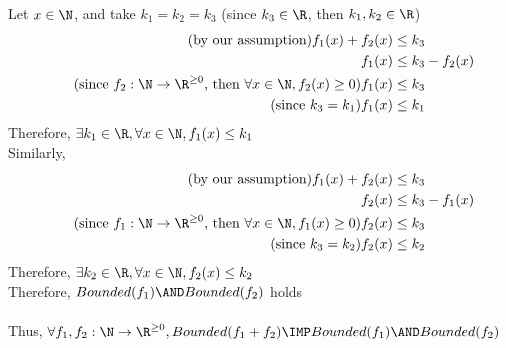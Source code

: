 \documentclass[12pt]{article}
\begin{document}
Let $x\in \N$, and take $k_1 = k_2 = k_3$ (since $k_3 \in \R$, then $k_1,k_2 \in \R$)\\
\begin{align*}
    \tag{by our assumption}
    f_1(x) + f_2(x) &\le k_3\\
    f_1(x) &\le k_3 - f_2(x)\\
    \tag{since $f_2:\N \to \R^{\ge 0}$, then $\forall x \in \N,f_2(x) \ge 0$}
    f_1(x) &\le k_3\\
    \tag{since $k_3 = k_1$}
    f_1(x) &\le k_1
\end{align*}
Therefore, $\exists k_1 \in \R,\forall x \in \N,f_1(x) \le k_1$\\
Similarly,\\
\begin{align*}
    \tag{by our assumption}
    f_1(x) + f_2(x) &\le k_3\\
    f_2(x) &\le k_3 - f_1(x)\\
    \tag{since $f_1:\N \to \R^{\ge 0}$, then $\forall x \in \N,f_1(x) \ge 0$}
    f_2(x) &\le k_3\\
    \tag{since $k_3 = k_2$}
    f_2(x) &\le k_2
\end{align*}
Therefore, $\exists k_2 \in \R,\forall x \in \N,f_2(x) \le k_2$\\
Therefore, $Bounded(f_1) \AND Bounded(f_2)$ holds\\
\\
Thus, $\forall f_1,f_2:\N \to \R^{\ge 0}, Bounded(f_1 + f_2) \IMP Bounded(f_1) \AND Bounded(f_2)$
\end{document}
